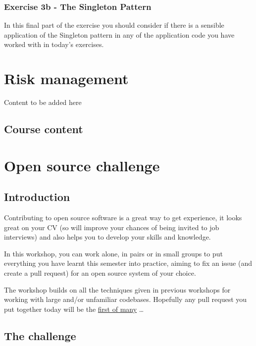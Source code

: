 \documentclass[
]{book}
\begin{document}
\hypertarget{singleton}{%
\subsection{Exercise 3b - The Singleton Pattern}\label{singleton}}

In this final part of the exercise you should consider if there is a sensible application of the Singleton pattern in any of the application code you have worked with in today's exercises.

\hypertarget{risking}{%
\chapter{Risk management}\label{risking}}

Content to be added here

\hypertarget{course-content-2}{%
\section{Course content}\label{course-content-2}}

\hypertarget{opening}{%
\chapter{Open source challenge}\label{opening}}

\hypertarget{introduction-1}{%
\section{Introduction}\label{introduction-1}}

Contributing to open source software is a great way to get experience, it looks great on your CV (so will improve your chances of being invited to job interviews) and also helps you to develop your skills and knowledge. \citep{experiencing, spinellis}

In this workshop, you can work alone, in pairs or in small groups to put everything you have learnt this semester into practice, aiming to fix an issue (and create a pull request) for an open source system of your choice.

The workshop builds on all the techniques given in previous workshops for working with large and/or unfamiliar codebases.
Hopefully any pull request you put together today will be the \href{http://firstpr.me}{first of many} \ldots{}

\hypertarget{challenge}{%
\section{The challenge}\label{challenge}}
\end{document}
